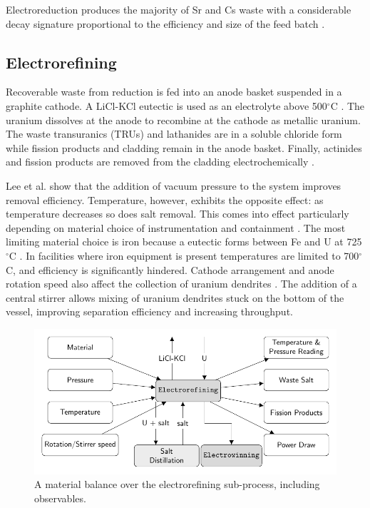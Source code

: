 \documentclass{anstrans}
\begin{document}
Electroreduction produces the majority of Sr and Cs waste with a considerable decay 
signature proportional to the efficiency and size of the feed batch \cite{Borrelli_2017,flowsheet_1998}.

\subsection{Electrorefining}

Recoverable waste from reduction is fed into an anode basket suspended in a graphite cathode. A LiCl-KCl eutectic is used as 
an electrolyte above 500$^{\circ}$C \cite{flowsheet_1998,lee_korean_2011}. The uranium dissolves at the anode to recombine at 
the cathode as metallic uranium. The waste transuranics (TRUs) and lathanides are in a soluble chloride form  while fission 
products and cladding remain in the anode basket. Finally, actinides and fission products are removed from the cladding 
electrochemically \cite{lee_korean_2011}.

Lee et al. \cite{lee_advanced_2008} show that the addition of vacuum pressure to the system improves removal efficiency. 
Temperature, however, exhibits the opposite effect: as temperature decreases so does salt removal. This comes into effect 
particularly depending on material choice of instrumentation and containment \cite{lee_advanced_2008}. The most limiting 
material choice is iron because a eutectic forms between Fe and U at 725$^{\circ}$C \cite{chapman_revision_1984}. 
In facilities where iron equipment is present temperatures are limited to 700$^{\circ}$C, and efficiency is 
significantly hindered. Cathode arrangement and anode rotation speed also affect the collection of uranium 
dendrites \cite{lee_advanced_2008}. The addition of a central stirrer allows mixing of uranium dendrites stuck on 
the bottom of the vessel, improving separation efficiency and increasing throughput. 

\begin{figure}[ht]
	\centering
	\includegraphics[width=0.9\linewidth]{refining}
	\caption{A material balance over the electrorefining sub-process, including observables.}
	\label{fig:refining}
\end{figure}
\end{document}
